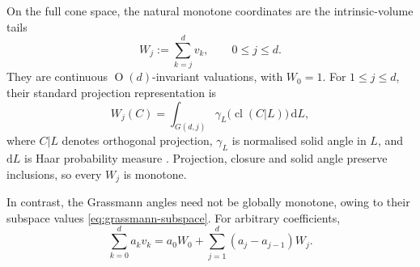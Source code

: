 \documentclass[11pt]{article}
\newcommand{\On}[1]{\operatorname{O}(#1)}
\newcommand{\cl}{\operatorname{cl}}
\theoremstyle{plain}
\theoremstyle{definition}
\begin{document}
On the full cone space, the natural monotone coordinates are the
intrinsic-volume tails
\begin{equation}\label{eq:tail-functional}
  W_j:=\sum_{k=j}^{d}v_k,\qquad 0\le j\le d.
\end{equation}
They are continuous $\On d$-invariant valuations, with $W_0=1$.
For $1\le j\le d$, their standard projection representation is
\begin{equation}\label{eq:tail-projection}
  W_j(C)=\int_{G(d,j)}
     \gamma_L\bigl(\cl(C\vert L)\bigr)\,\mathrm{d}L,
\end{equation}
where $C\vert L$ denotes orthogonal projection, $\gamma_L$ is normalised
solid angle in $L$, and $\mathrm{d}L$ is Haar probability measure
\cite[equations~(2.76)--(2.77) and (4.70)]{Sch22:Convex-Cones}.
Projection, closure and solid angle preserve inclusions, so every $W_j$ is
monotone.

In contrast, the Grassmann angles need not be globally monotone,
owing to their subspace values \eqref{eq:grassmann-subspace}.
For arbitrary coefficients,
\begin{equation}\label{eq:tail-expansion}
  \sum_{k=0}^{d}a_kv_k
  =a_0W_0+\sum_{j=1}^{d}(a_j-a_{j-1})W_j.
\end{equation}
\end{document}
